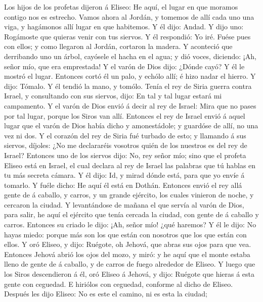  Los hijos de los profetas dijeron á Eliseo: He aquí, el
lugar en que moramos contigo nos es estrecho.  Vamos ahora
al Jordán, y tomemos de allí cada uno una viga, y hagámonos allí lugar
en que habitemos. Y él dijo: Andad.  Y dijo uno: Rogámoste
que quieras venir con tus siervos. Y él respondió: Yo iré. 
Fuése pues con ellos; y como llegaron al Jordán, cortaron la madera.
 Y aconteció que derribando uno un árbol, cayósele el hacha
en el agua; y dió voces, diciendo: ¡Ah, señor mío, que era emprestada!
 Y el varón de Dios dijo: ¿Dónde cayó? Y él le mostró el
lugar. Entonces cortó él un palo, y echólo allí; é hizo nadar el hierro.
 Y dijo: Tómalo. Y él tendió la mano, y tomólo. 
Tenía el rey de Siria guerra contra Israel, y consultando con sus
siervos, dijo: En tal y tal lugar estará mi campamento.  Y
el varón de Dios envió á decir al rey de Israel: Mira que no pases por
tal lugar, porque los Siros van allí.  Entonces el rey de
Israel envió á aquel lugar que el varón de Dios había dicho y
amonestádole; y guardóse de allí, no una vez ni dos.  Y el
corazón del rey de Siria fué turbado de esto; y llamando á sus siervos,
díjoles: ¿No me declararéis vosotros quién de los nuestros es del rey de
Israel?  Entonces uno de los siervos dijo: No, rey señor
mío; sino que el profeta Eliseo está en Israel, el cual declara al rey
de Israel las palabras que tú hablas en tu más secreta cámara.
 Y él dijo: Id, y mirad dónde está, para que yo envíe á
tomarlo. Y fuéle dicho: He aquí él está en Dothán. 
Entonces envió el rey allá gente de á caballo, y carros, y un grande
ejército, los cuales vinieron de noche, y cercaron la ciudad.
 Y levantándose de mañana el que servía al varón de Dios,
para salir, he aquí el ejército que tenía cercada la ciudad, con gente
de á caballo y carros. Entonces su criado le dijo: ¡Ah, señor mío! ¿qué
haremos?  Y él le dijo: No hayas miedo: porque más son los
que están con nosotros que los que están con ellos.  Y oró
Eliseo, y dijo: Ruégote, oh Jehová, que abras sus ojos para que vea.
Entonces Jehová abrió los ojos del mozo, y miró: y he aquí que el monte
estaba lleno de gente de á caballo, y de carros de fuego alrededor de
Eliseo.  Y luego que los Siros descendieron á él, oró
Eliseo á Jehová, y dijo: Ruégote que hieras á esta gente con ceguedad. E
hiriólos con ceguedad, conforme al dicho de Eliseo. 
Después les dijo Eliseo: No es este el camino, ni es esta la ciudad;
